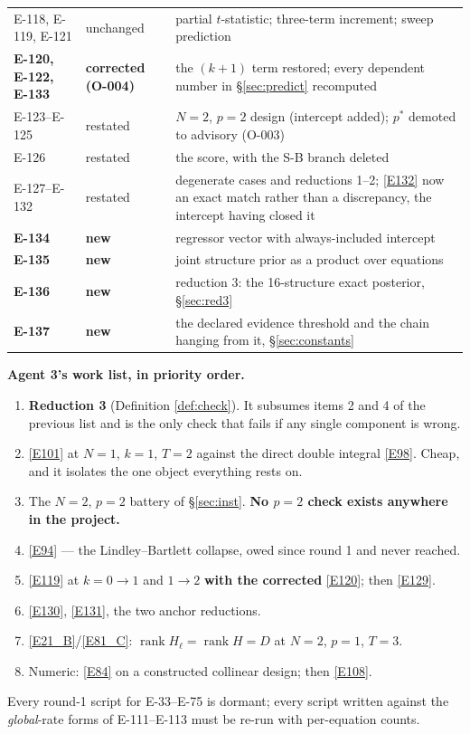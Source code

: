 {\begin{longtable}{@{}>{\raggedright\arraybackslash}p{4.4cm}
                    >{\raggedright\arraybackslash}p{3.4cm}
                    >{\raggedright\arraybackslash}p{8.9cm}@{}}
E-118, E-119, E-121 & unchanged &
  partial $t$-statistic; three-term increment; sweep prediction \\
\textbf{E-120, E-122, E-133} & \textbf{corrected (O-004)} &
  the $(k+1)$ term restored; every dependent number in \S\ref{sec:predict}
  recomputed \\
E-123--E-125 & restated &
  $N=2$, $p=2$ design (intercept added); $p^*$ demoted to advisory (O-003) \\
E-126 & restated & the score, with the S-B branch deleted \\
E-127--E-132 & restated &
  degenerate cases and reductions 1--2; \eqref{E132} now an exact match rather than
  a discrepancy, the intercept having closed it \\
\midrule
\textbf{E-134} & \textbf{new} & regressor vector with always-included intercept \\
\textbf{E-135} & \textbf{new} & joint structure prior as a product over equations \\
\textbf{E-136} & \textbf{new} &
  reduction 3: the 16-structure exact posterior, \S\ref{sec:red3} \\
\textbf{E-137} & \textbf{new} &
  the declared evidence threshold and the chain hanging from it,
  \S\ref{sec:constants} \\
\end{longtable}
}

\noindent\textbf{Agent 3's work list, in priority order.}
\begin{enumerate}[topsep=0pt, itemsep=0pt]
\item \textbf{Reduction 3} (Definition \ref{def:check}). It subsumes items 2 and 4 of
  the previous list and is the only check that fails if any single component is
  wrong.
\item \eqref{E101} at $N=1$, $k=1$, $T=2$ against the direct double integral
  \eqref{E98}. Cheap, and it isolates the one object everything rests on.
\item The $N=2$, $p=2$ battery of \S\ref{sec:inst}. \textbf{No $p=2$ check exists
  anywhere in the project.}
\item \eqref{E94} --- the Lindley--Bartlett collapse, owed since round 1 and never
  reached.
\item \eqref{E119} at $k=0\to1$ and $1\to2$ \textbf{with the corrected}
  \eqref{E120}; then \eqref{E129}.
\item \eqref{E130}, \eqref{E131}, the two anchor reductions.
\item \eqref{E21_B}/\eqref{E81_C}: $\operatorname{rank}H_\ell=\operatorname{rank}H=D$ at
  $N=2$, $p=1$, $T=3$.
\item Numeric: \eqref{E84} on a constructed collinear design; then \eqref{E108}.
\end{enumerate}
Every round-1 script for E-33--E-75 is dormant; every script written against the
\emph{global}-rate forms of E-111--E-113 must be re-run with per-equation counts.

